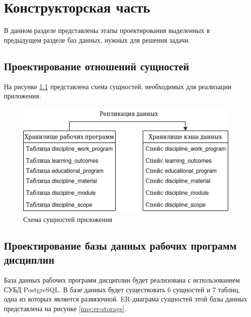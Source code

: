 \chapter{Конструкторская часть}

В данном разделе представлены этапы проектирования выделенных в предыдущем разделе баз данных, нужных для решения задачи.

\section{Проектирование отношений сущностей}

На рисунке \ref{img:arch} представлена схема сущностей, необходимых для реализации приложения.

\begin{figure}[h!]
	\begin{center}
		\includegraphics[scale=0.5]{img/arch.jpg}
	\end{center}
	\captionsetup{justification=centering}
	\caption{Схема сущностей приложения}
	\label{img:arch}
\end{figure}

\section{Проектирование базы данных рабочих программ дисциплин}

База данных рабочих программ дисциплин будет реализована с использованием СУБД PostgreSQL. В базе данных будет существовать 6 сущностей и 7 таблиц, одна из которых является развязочной. ER-диаграма сущностей этой базы данных представлена на рисунке \ref{img:er-storage}.\\

